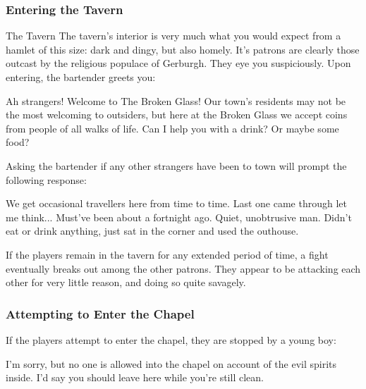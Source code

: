 \documentclass[10pt,twoside,twocolumn]{article}
\begin{document}
\newpage

\subsubsection{Entering the Tavern}
\begin{paperbox}{The Tavern}
    The tavern's interior is very much what you would expect from a hamlet of this size: dark and dingy, but also homely.  It's patrons are clearly those outcast by the religious populace of Gerburgh.  They eye you suspiciously.  Upon entering, the bartender greets you:
\end{paperbox}
\begin{quotebox}
    Ah strangers!  Welcome to The Broken Glass!  Our town's residents may not be the most welcoming to outsiders, but here at the Broken Glass we accept coins from people of all walks of life.  Can I help you with a drink?  Or maybe some food?
\end{quotebox}

Asking the bartender if any other strangers have been to town will prompt the following response:
\begin{quotebox}
    We get occasional travellers here from time to time.  Last one came through let me think... Must've been about a fortnight ago.  Quiet, unobtrusive man.  Didn't eat or drink anything, just sat in the corner and used the outhouse.
\end{quotebox}

If the players remain in the tavern for any extended period of time, a fight eventually breaks out among the other patrons.  They appear to be attacking each other for very little reason, and doing so quite savagely.

\subsubsection{Attempting to Enter the Chapel}
If the players attempt to enter the chapel, they are stopped by a young boy:
\begin{quotebox}
    I'm sorry, but no one is allowed into the chapel on account of the evil spirits inside.  I'd say you should leave here while you're still clean.
\end{quotebox}

\newpage
\end{document}

